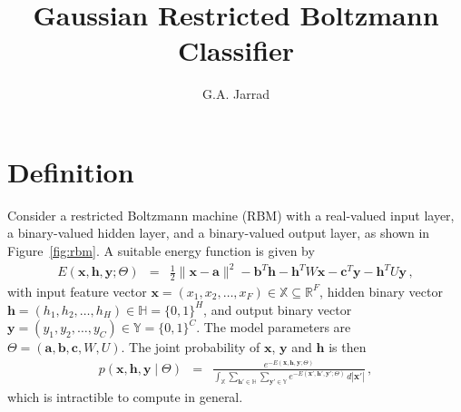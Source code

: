 \documentclass[a4paper]{article}
\title{Gaussian Restricted Boltzmann Classifier}
\author{G.A. Jarrad}
\renewcommand{\v}[1]{\mathbf{#1}}
\begin{document}
\maketitle
{}
\section{Definition}\label{sec:intro}
Consider a restricted Boltzmann machine (RBM) with a real-valued input layer,
a binary-valued hidden layer, and a binary-valued output layer, as shown in 
Figure~\ref{fig:rbm}.
A suitable energy function is given by
\begin{eqnarray}
    E(\v{x},\v{h},\v{y}; \Theta) & = & \frac{1}{2}\|\v{x}-\v{a}\|^2
    - \v{b}^T\v{h} - \v{h}^T W\v{x} - \v{c}^T\v{y} - \v{h}^T U\v{y}\,,
\label{eq:energy}
\end{eqnarray}
with input feature vector $\v{x}=(x_1,x_2,\ldots,x_F)\in\mathbb{X}\subseteq\mathbb{R}^F$, 
hidden binary vector $\v{h}=(h_1,h_2,\ldots,h_H)\in\mathbb{H}=\{0,1\}^H$, and output 
binary vector $\v{y}=(y_1,y_2,\ldots,y_C)\in\mathbb{Y}=\{0,1\}^C$.
The model parameters are $\Theta=(\v{a}, \v{b}, \v{c}, W, U)$.
The joint probability of $\v{x}$, $\v{y}$ and $\v{h}$ is then
\begin{eqnarray}
    p(\v{x},\v{h},\v{y}\;|\;\Theta) & = & \frac{e^{-E(\v{x},\v{h},\v{y}; \Theta)}}
{\int_{\mathbb{X}}\sum_{\v{h}'\in\mathbb{H}}\sum_{\v{y}'\in\mathbb{Y}}
e^{-E(\v{x}',\v{h}',\v{y}'; \Theta)}\,d|\v{x}'|
}
\,,
\end{eqnarray}
which is intractible to compute in general.
\end{document}
